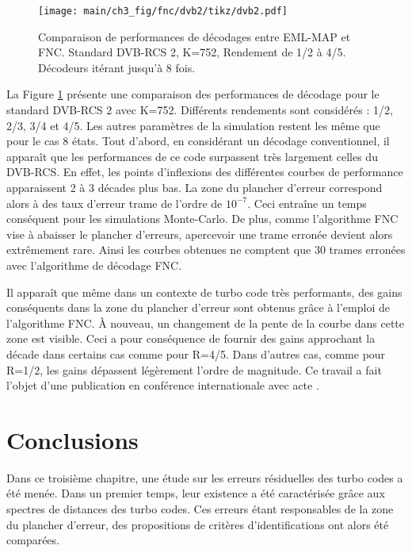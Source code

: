 \begin{figure}[!htb]
	\centering
	\texttt{[image: main/ch3\_fig/fnc/dvb2/tikz/dvb2.pdf]}
	\caption{Comparaison de performances de décodages entre EML-MAP et FNC. Standard DVB-RCS 2, K=752, Rendement de 1/2 à 
	4/5. Décodeurs itérant jusqu'à 8 fois. \label{fig:fnc_dvb2_752}}
\end{figure}

La Figure \ref{fig:fnc_dvb2_752} présente une comparaison des performances de décodage pour le standard DVB-RCS 2 avec
K=752. Différents rendements sont considérés : 1/2, 2/3, 3/4 et 4/5. Les autres paramètres de la simulation restent les
même que pour le cas 8 états.
Tout d'abord, en considérant un décodage conventionnel, il apparaît que les performances de ce code surpassent très largement 
celles du DVB-RCS. En effet, les points d'inflexions des différentes courbes de performance apparaissent 2 à 3 décades
plus bas. La zone du plancher d'erreur correspond alors à des taux d'erreur trame de l'ordre de $10^{-7}$. Ceci entraîne
un temps conséquent pour les simulations Monte-Carlo. De plus, comme l'algorithme FNC vise à abaisser le plancher 
d'erreurs, apercevoir une trame erronée devient alors extrêmement rare. Ainsi les courbes obtenues ne comptent que 30 
trames erronées avec l'algorithme de décodage FNC.

Il apparaît que même dans un contexte de turbo code très performants, des gains conséquents dans la zone du plancher d'erreur 
sont obtenus grâce à l'emploi de l'algorithme FNC. À nouveau, un changement de la pente de la courbe dans cette zone est
visible. Ceci a pour conséquence de fournir des gains approchant la décade dans certains cas comme pour R=4/5. Dans d'autres
cas, comme pour R=1/2, les gains dépassent légèrement l'ordre de magnitude. Ce travail a fait l'objet d'une publication en
conférence internationale avec acte .

\section{Conclusions}
Dans ce troisième chapitre, une étude sur les erreurs résiduelles des turbo codes a été menée. Dans un premier temps,
leur existence a été caractérisée grâce aux spectres de distances des turbo codes. Ces erreurs étant responsables de 
la zone du plancher d'erreur, des propositions de critères d'identifications ont alors été comparées.


